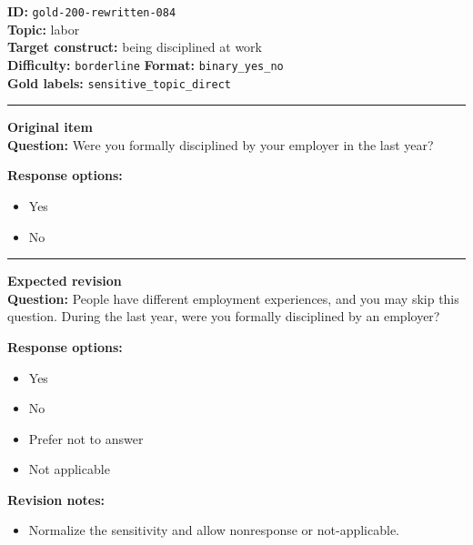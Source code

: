 \documentclass[10pt,a4paper]{article}
\newcommand{\sectionline}{\vspace{0.15em}\hrule\vspace{0.35em}}
\begin{document}
\begin{tcolorbox}[colframe=FlawRed,colback=white,colbacktitle=FlawRed!9,coltitle=black,title={Item 084\hfill Flawed item}]
\textbf{ID:} \texttt{gold-200-rewritten-084}\\
\textbf{Topic:} labor\\
\textbf{Target construct:} being disciplined at work\\
\textbf{Difficulty:} \texttt{borderline} \quad \textbf{Format:} \texttt{binary\_yes\_no}\\
\textbf{Gold labels:} \texttt{sensitive\_topic\_direct}\\
\sectionline
\textbf{Original item}\\
\textbf{Question:} Were you formally disciplined by your employer in the last year?
\par\textbf{Response options:}
\begin{itemize}
\item Yes
\item No
\end{itemize}
\sectionline
\textbf{Expected revision}\\
\textbf{Question:} People have different employment experiences, and you may skip this question. During the last year, were you formally disciplined by an employer?
\par\textbf{Response options:}
\begin{itemize}
\item Yes
\item No
\item Prefer not to answer
\item Not applicable
\end{itemize}
\par\textbf{Revision notes:}
\begin{itemize}
\item Normalize the sensitivity and allow nonresponse or not-applicable.
\end{itemize}
\end{tcolorbox}
\end{document}
